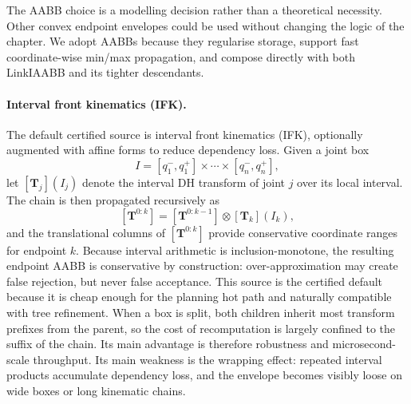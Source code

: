 \documentclass[journal]{IEEEtran}
\begin{document}
The AABB choice is a modelling decision rather than a theoretical necessity.
Other convex endpoint envelopes could be used without changing the logic of the
chapter. We adopt AABBs because they regularise storage, support fast
coordinate-wise min/max propagation, and compose directly with both LinkIAABB
and its tighter descendants.

\paragraph{Interval front kinematics (IFK).}
The default certified source is interval front kinematics (IFK), optionally
augmented with affine forms to reduce dependency loss. Given a joint box
\[
I = [q_1^-,q_1^+] \times \cdots \times [q_n^-,q_n^+],
\]
let $[\bm{T}_j](I_j)$ denote the interval DH transform of joint $j$ over its
local interval. The chain is then propagated recursively as
\[
[\bm{T}^{0:k}] = [\bm{T}^{0:k-1}] \otimes [\bm{T}_k](I_k),
\]
and the translational columns of $[\bm{T}^{0:k}]$ provide conservative
coordinate ranges for endpoint $k$. Because interval arithmetic is
inclusion-monotone, the resulting endpoint AABB is conservative by
construction: over-approximation may create false rejection, but never false
acceptance. This source is the certified default because it is cheap enough for
the planning hot path and naturally compatible with tree refinement. When a box
is split, both children inherit most transform prefixes from the parent, so the
cost of recomputation is largely confined to the suffix of the chain. Its main
advantage is therefore robustness and microsecond-scale throughput. Its main
weakness is the wrapping effect: repeated interval products accumulate
dependency loss, and the envelope becomes visibly loose on wide boxes or long
kinematic chains.
\end{document}
